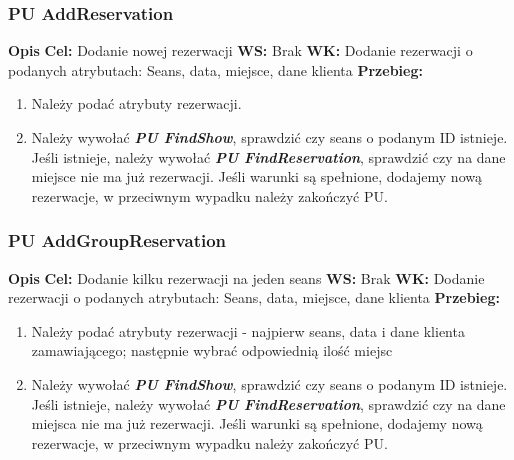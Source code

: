 \documentclass{article}
\begin{document}
	\subsubsection{PU AddReservation}
	\noindent \textbf{Opis}
	\newline \textbf{Cel: } Dodanie nowej rezerwacji
	\newline \textbf{WS: } Brak
	\newline \textbf{WK: } Dodanie rezerwacji o podanych atrybutach: Seans, data, miejsce, dane klienta
	\newline \textbf{Przebieg: }
	\begin{enumerate}
		\item Należy podać atrybuty rezerwacji.
		\item Należy wywołać \textit{\textbf{PU FindShow}}, sprawdzić czy seans o podanym ID istnieje. Jeśli istnieje, należy wywołać \textit{\textbf{PU FindReservation}}, sprawdzić czy na dane miejsce nie ma już rezerwacji. Jeśli warunki są spełnione, dodajemy nową rezerwacje, w przeciwnym wypadku należy zakończyć PU.
	\end{enumerate}
	
	\subsubsection{PU AddGroupReservation}
	\noindent \textbf{Opis}
	\newline \textbf{Cel: } Dodanie kilku rezerwacji na jeden seans
	\newline \textbf{WS: } Brak
	\newline \textbf{WK: } Dodanie rezerwacji o podanych atrybutach: Seans, data, miejsce, dane klienta
	\newline \textbf{Przebieg: }
	\begin{enumerate}
		\item Należy podać atrybuty rezerwacji - najpierw seans, data i dane klienta zamawiającego; następnie wybrać odpowiednią ilość miejsc
		\item Należy wywołać \textit{\textbf{PU FindShow}}, sprawdzić czy seans o podanym ID istnieje. Jeśli istnieje, należy wywołać \textit{\textbf{PU FindReservation}}, sprawdzić czy na dane miejsca nie ma już rezerwacji. Jeśli warunki są spełnione, dodajemy nową rezerwacje, w przeciwnym wypadku należy zakończyć PU.
	\end{enumerate}
	
	\newpage
\end{document}
